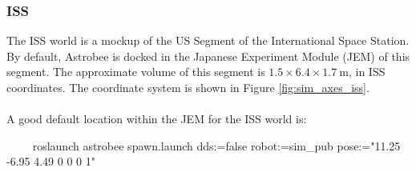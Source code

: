 \documentclass{article}
\begin{document}
\subsubsection{ISS}
The ISS world is a mockup of the US Segment of the International Space Station. By default, Astrobee is docked in the Japanese Experiment Module (JEM) of this segment. The approximate volume of this segment is $1.5 \times 6.4 \times 1.7\ \text{m}$, in ISS coordinates. The coordinate system is shown in Figure \ref{fig:sim_axes_iss}.
\\\\
A good default location within the JEM for the ISS world is:
\begin{markdown}
~~~~
roslaunch astrobee spawn.launch dds:=false
robot:=sim_pub pose:="11.25 -6.95 4.49 0 0 0 1" 
~~~~~
\end{markdown}
\end{document}
